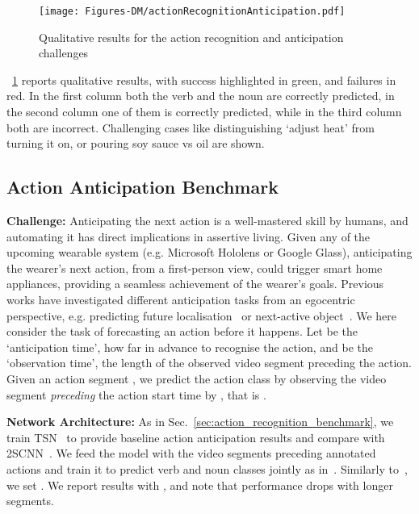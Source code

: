\documentclass[runningheads]{llncs}
\begin{document}
\begin{figure}[t!]
\vspace{-2mm}
\centering
\texttt{[image: Figures-DM/actionRecognitionAnticipation.pdf]}
\vspace{-2mm}
\caption{Qualitative results for the action recognition and anticipation challenges}
\label{fig:recognitionPrediction_qualitative}
\end{figure}

\figurename~\ref{fig:recognitionPrediction_qualitative} reports qualitative results, with success highlighted in green, and failures in red. In the first column both the verb and the noun are correctly predicted, in the second column one of them is correctly predicted, while in the third column both are incorrect. Challenging cases like distinguishing `adjust heat' from turning it on, or pouring soy sauce vs oil are shown.

\vspace{-4mm}
\subsection{Action Anticipation Benchmark}
\vspace{-2mm}
\noindent\textbf{Challenge:} 
Anticipating the next action is a well-mastered skill by humans, and automating it has direct implications in assertive living.
Given any of the upcoming wearable system (e.g. Microsoft Hololens or Google Glass), anticipating the wearer's next action, from a first-person view, could trigger smart home appliances, providing a seamless achievement of the wearer's goals.
Previous works have investigated different anticipation tasks from an egocentric perspective, e.g. predicting future localisation~\cite{park2016egocentric} or next-active object~\cite{furnari2017next}. We here consider the task of forecasting an action before it happens. Let  be the `anticipation time', how far in advance to recognise the action, and  be the `observation time', the length of the observed video segment preceding the action. Given an action segment , we predict
the action class  by observing the video segment \emph{preceding} the action start time  by , that is .

\noindent\textbf{Network Architecture:}
As in Sec.~\ref{sec:action_recognition_benchmark}, we train TSN~\cite{wang2016tsn} to provide baseline action anticipation results and compare with 2SCNN~\cite{simonyan2014two}. We feed the model with the video segments preceding annotated actions and train it to predict verb and noun classes jointly as in~\cite{kalogeiton2017}. Similarly to~\cite{vondrick2016anticipating}, we set . We report results with , and note that performance drops with longer segments. 
\end{document}
